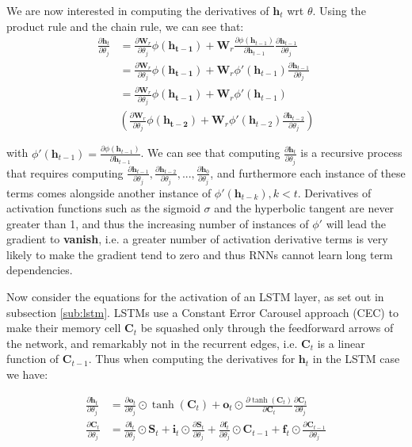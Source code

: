 \documentclass[pdftex,10pt,a4paper,journal]{article}
\theoremstyle{definition}
\theoremstyle{remark}
\newcommand*{\V}[1]{\mathbf{#1}}%
\newcommand{\parder}[2]{\frac{\partial{#1}}{\partial{#2}}}
\begin{document}
\begin{multicols}{2}
\par We are now interested in computing the derivatives of $\V{h}_t$ wrt $\theta$. Using the product rule and the chain rule, we can see that:
\begin{align*}
    \frac{\partial\V{h}_t}{\partial\theta_j} &= \frac{\partial\V{W}_r}{\partial\theta_j} \phi(\V{h_{t-1}}) + \V{W}_r\frac{\partial \phi(\V{h}_{t-1})}{\partial\V{h}_{t-1}}\frac{\partial \V{h}_{t-1}}{\partial\theta_j}\\
    &= \frac{\partial\V{W}_r}{\partial\theta_j} \phi(\V{h_{t-1}}) + \V{W}_r\phi'(\V{h}_{t-1})\frac{\partial \V{h}_{t-1}}{\partial\theta_j}\\
    &= \frac{\partial\V{W}_r}{\partial\theta_j} \phi(\V{h_{t-1}}) + \V{W}_r\phi'(\V{h}_{t-1})\\&\left(\frac{\partial\V{W}_r}{\partial\theta_j} \phi(\V{h_{t-2}}) + \V{W}_r\phi'(\V{h}_{t-2})\frac{\partial \V{h}_{t-2}}{\partial\theta_j}\right)
\end{align*}

with $\phi'(\V{h}_{t-1}) = \frac{\partial \phi(\V{h}_{t-1})}{\partial\V{h}_{t-1}}$. We can see that computing $\frac{\partial\V{h}_t}{\partial\theta_j}$ is a recursive process that requires computing $\frac{\partial\V{h}_{t-1}}{\partial\theta_j}, \frac{\partial\V{h}_{t-2}}{\partial\theta_j}, ..., \frac{\partial\V{h}_0}{\partial\theta_j}$, and furthermore each instance of these terms comes alongside another instance of $\phi'(\V{h}_{t-k}), k<t$. Derivatives of activation functions such as the sigmoid $\sigma$ and the hyperbolic tangent are never greater than 1, and thus the increasing number of instances of $\phi'$ will lead the gradient to \textbf{vanish}, i.e. a greater number of activation derivative terms is very likely to make the gradient tend to zero and thus RNNs cannot learn long term dependencies.

\par Now consider the equations for the activation of an LSTM layer, as set out in subsection \ref{sub:lstm}. LSTMs use a Constant Error Carousel approach (CEC) to make their memory cell $\V{C}_t$ be squashed only through the feedforward arrows of the network, and remarkably not in the recurrent edges, i.e. $\V{C}_t$ is a linear function of $\V{C}_{t-1}$. Thus when computing the derivatives for $\V{h}_t$ in the LSTM case we have:

\begin{align*}
    \parder{\V{h}_t}{\theta_j} &= \parder{\V{o}_t}{\theta_j}\odot \tanh(\V{C}_t) + \V{o}_t\odot\parder{\tanh(\V{C}_t)}{\V{C}_t}\parder{\V{C}_t}{\theta_j}\\
    \parder{\V{C}_t}{\theta_j} &= \parder{\V{i}_t}{\theta_j}\odot\V{S}_t +  \V{i}_t\odot\parder{\V{S}_t}{\theta_j} + \parder{\V{f}_t}{\theta_j}\odot\V{C}_{t-1} + \V{f}_t\odot\parder{\V{C}_{t-1}}{\theta_j}
\end{align*}


\end{multicols}
\end{document}
